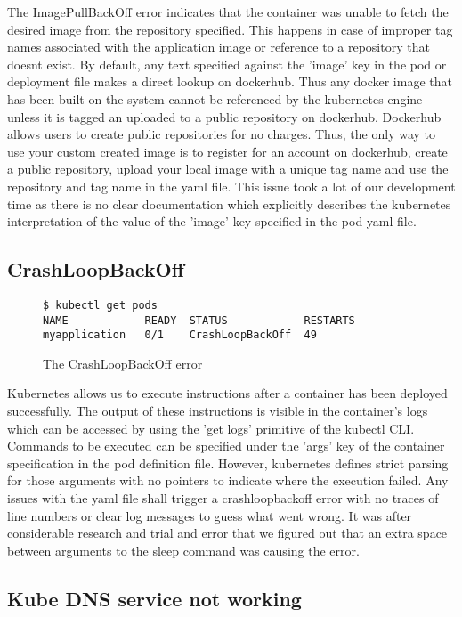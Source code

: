 \documentclass[9pt,twocolumn,twoside]{../../styles/osajnl}
\begin{document}
The ImagePullBackOff error indicates that the container was unable to
fetch the desired image from the repository specified. This happens in
case of improper tag names associated with the application image or
reference to a repository that doesnt exist.  By default, any text
specified against the 'image' key in the pod or deployment file makes
a direct lookup on dockerhub. Thus any docker image that has been
built on the system cannot be referenced by the kubernetes engine
unless it is tagged an uploaded to a public repository on
dockerhub. Dockerhub allows users to create public repositories for no
charges. Thus, the only way to use your custom created image is to
register for an account on dockerhub, create a public repository,
upload your local image with a unique tag name and use the repository
and tag name in the yaml file. This issue took a lot of our
development time as there is no clear documentation which explicitly
describes the kubernetes interpretation of the value of the 'image'
key specified in the pod yaml file.

\subsection{CrashLoopBackOff}
\begin{figure}[H]
\begin{verbatim}
$ kubectl get pods
NAME            READY  STATUS            RESTARTS  
myapplication   0/1    CrashLoopBackOff  49
\end{verbatim}
\caption{The CrashLoopBackOff error}
\vspace{-3mm}
\label{The CrashLoopBackOff error}
\end{figure}
Kubernetes allows us to execute instructions after a container has
been deployed successfully. The output of these instructions is
visible in the container's logs which can be accessed by using the
'get logs' primitive of the kubectl CLI. Commands to be executed can
be specified under the 'args' key of the container specification in
the pod definition file. However, kubernetes defines strict parsing
for those arguments with no pointers to indicate where the execution
failed. Any issues with the yaml file shall trigger a crashloopbackoff
error with no traces of line numbers or clear log messages to guess
what went wrong. It was after considerable research and trial and
error that we figured out that an extra space between arguments to the
sleep command was causing the error.


\subsection{Kube DNS service not working}
\end{document}
